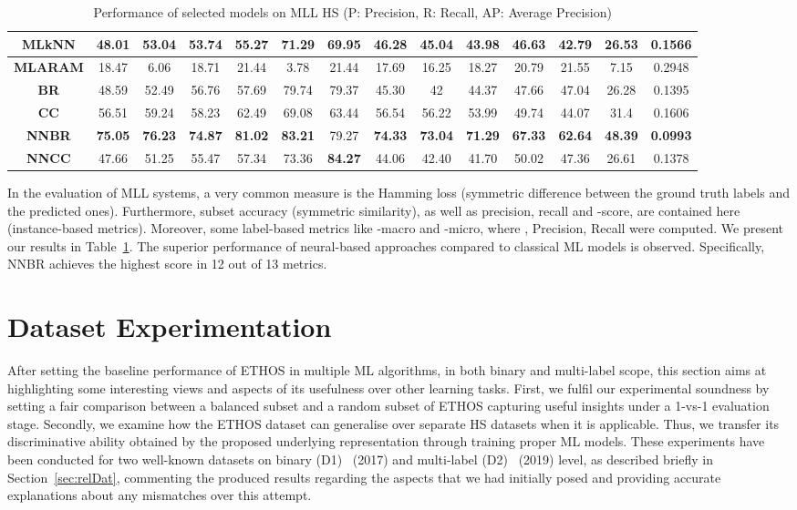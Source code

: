 \documentclass{article}
\begin{document}
\begin{table}[ht]
{\begin{tabular}{|c|c|c|c|c|c|c|c|c|c|c|c|c|c|}
\textbf{MLkNN} & 48.01 & 53.04 & 53.74 & 55.27 & 71.29 & 69.95 & 46.28 & 45.04 & 43.98 & 46.63 & 42.79 & 26.53 & 0.1566 \\ \hline
\textbf{MLARAM} & 18.47 & 6.06 & 18.71 & 21.44 & 3.78 & 21.44 & 17.69 & 16.25 & 18.27 & 20.79 & 21.55 & 7.15 & 0.2948 \\ \hline
\textbf{BR} & 48.59 & 52.49 & 56.76 & 57.69 & 79.74 & 79.37 & 45.30 & 42 & 44.37 & 47.66 & 47.04 & 26.28 & 0.1395 \\ \hline
\textbf{CC} & 56.51 & 59.24 & 58.23 & 62.49 & 69.08 & 63.44 & 56.54 & 56.22 & 53.99 & 49.74 & 44.07 & 31.4 & 0.1606 \\ \hline
\textbf{NNBR} & \textbf{75.05} & \textbf{76.23} & \textbf{74.87} & \textbf{81.02} & \textbf{83.21} & 79.27 & \textbf{74.33} & \textbf{73.04} & \textbf{71.29} & \textbf{67.33} & \textbf{62.64} & \textbf{48.39} & \textbf{0.0993} \\ \hline
\textbf{NNCC} & 47.66 & 51.25 & 55.47 & 57.34 & 73.36 & \textbf{84.27} & 44.06 & 42.40 & 41.70 & 50.02 & 47.36 & 26.61 & 0.1378 \\ \hline
\end{tabular}}
\caption{Performance of selected models on MLL HS (P: Precision, R: Recall, AP: Average Precision)}
\label{tab:mllresults}
\end{table}

In the evaluation of MLL systems, a very common measure is the Hamming loss (symmetric difference between the ground truth labels and the predicted ones). Furthermore, subset accuracy (symmetric similarity), as well as precision, recall and -score, are contained here (instance-based metrics). Moreover, some label-based metrics like -macro and -micro, where , Precision, Recall were computed. We present our results in Table~\ref{tab:mllresults}. The superior performance of neural-based approaches compared to classical ML models is observed. Specifically, NNBR achieves the highest score in 12 out of 13 metrics.

\section{Dataset Experimentation}
After setting the baseline performance of ETHOS in multiple ML algorithms, in both binary and multi-label scope, this section aims at highlighting some interesting views and aspects of its usefulness over other learning tasks. First, we fulfil our experimental soundness by setting a fair comparison between a balanced subset and a random subset of ETHOS capturing useful insights under a 1-vs-1 evaluation stage. Secondly, we examine how the ETHOS dataset can generalise over separate HS datasets when it is applicable. Thus, we transfer its discriminative ability obtained by the proposed underlying representation through training proper ML models. These experiments have been conducted for two well-known datasets on binary (D1)~\cite{hateTweets} (2017) and multi-label (D2)~\cite{DBLP:conf/emnlp/OusidhoumLZSY19} (2019) level, as described briefly in Section~\ref{sec:relDat}, commenting the produced results regarding the aspects that we had initially posed and providing accurate explanations about any mismatches over this attempt.
\end{document}
